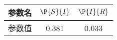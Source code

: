 \begin{tabular}{ccc}
\hline
参数名&$\P{S}{I}$&$\P{I}{R}$\\
\hline
参数值&0.381&0.033\\
\hline
\end{tabular}